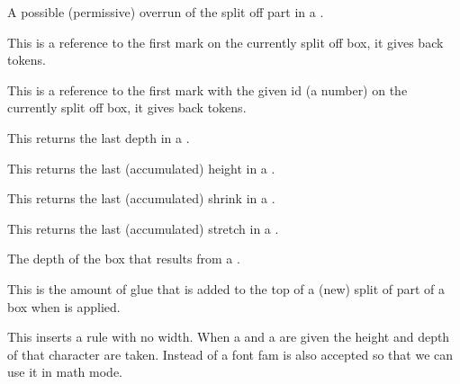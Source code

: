 \stopoldprimitive

\startnewprimitive[title={\prm {splitextraheight}}]

A possible (permissive) overrun of the split off part in a .

\stopnewprimitive

\startoldprimitive[title={\prm {splitfirstmark}}][obsolete=yes]

This is a reference to the first mark on the currently split off box, it gives
back tokens.

\stopoldprimitive

\startoldprimitive[title={\prm {splitfirstmarks}}]

This is a reference to the first mark with the given id (a number) on the
currently split off box, it gives back tokens.

\stopoldprimitive

\startnewprimitive[title={\prm {splitlastdepth}}]

This returns the last depth in a .

\stopnewprimitive

\startnewprimitive[title={\prm {splitlastheight}}]

This returns the last (accumulated) height in a .

\stopnewprimitive

\startnewprimitive[title={\prm {splitlastshrink}}]

This returns the last (accumulated) shrink in a .

\stopnewprimitive

\startnewprimitive[title={\prm {splitlaststretch}}]

This returns the last (accumulated) stretch in a .

\stopnewprimitive

\startoldprimitive[title={\prm {splitmaxdepth}}]

The depth of the box that results from a .

\stopoldprimitive

\startoldprimitive[title={\prm {splittopskip}}]

This is the amount of glue that is added to the top of a (new) split of part of a
box when  is applied.

\stopoldprimitive

\startnewprimitive[title={\prm {srule}}]

This inserts a rule with no width. When a  and a  are
given the height and depth of that character are taken. Instead of a font \type
{fam} is also accepted so that we can use it in math mode.

